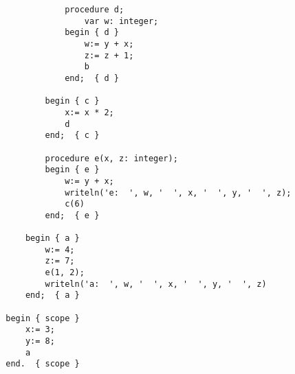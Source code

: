 \documentclass[11pt]{article}
\begin{document}
\begin{enumerate}
\begin{Verbatim}
                    procedure d;
                        var w: integer;
                    begin { d }
                        w:= y + x;
                        z:= z + 1;
                        b
                    end;  { d }

                begin { c }
                    x:= x * 2;
                    d
                end;  { c }

                procedure e(x, z: integer);
                begin { e }
                    w:= y + x;
                    writeln('e:  ', w, '  ', x, '  ', y, '  ', z);
                    c(6)
                end;  { e }

            begin { a }
                w:= 4;
                z:= 7;
                e(1, 2);
                writeln('a:  ', w, '  ', x, '  ', y, '  ', z)
            end;  { a }

        begin { scope }
            x:= 3;
            y:= 8;
            a
        end.  { scope }
          \end{Verbatim}

  \end{enumerate}
\end{document}

